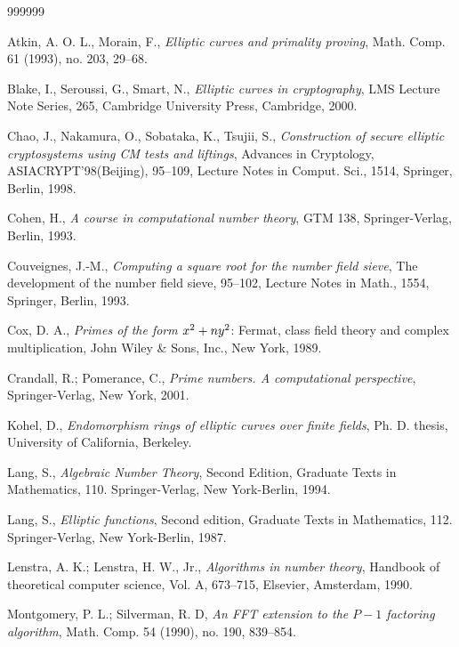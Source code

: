 \documentclass{amsart}
\newcommand{\nn}{\newline \noindent}
\theoremstyle{plain}
\begin{document}
\begin{thebibliography}{999999}

Atkin, A. O. L., Morain, F., 
{\it Elliptic curves and primality proving},
Math. Comp. 61 (1993), no. 203, 29--68. 

Blake, I., Seroussi, G., Smart, N.,
{\it Elliptic curves in cryptography}, LMS Lecture Note Series, 265, 
Cambridge University Press, Cambridge, 2000.

Chao, J., Nakamura, O., Sobataka, K., Tsujii, S., 
{\it Construction of secure elliptic cryptosystems using CM tests and liftings},
Advances in Cryptology, ASIACRYPT'98(Beijing), 95--109, Lecture Notes
in Comput. Sci., 1514, Springer, Berlin, 1998. 

Cohen, H.,
{\it A course in computational number theory}, GTM 138,
Springer-Verlag, Berlin, 1993.

Couveignes, J.-M., 
{\it Computing a square root for the number field sieve}, 
The development of the number field sieve, 95--102, Lecture
Notes in Math., 1554, Springer, Berlin, 1993. 

Cox, D. A., 
{\it Primes of the form $x\sp 2 + ny\sp 2$}: 
Fermat, class field theory and complex multiplication, 
John Wiley \& Sons, Inc., New York, 1989. 

Crandall, R.; Pomerance, C., {\it Prime numbers. A computational perspective},
Springer-Verlag, New York, 2001.


Kohel, D., 
{\it Endomorphism rings of elliptic curves over finite fields},
Ph. D. thesis, University of California, Berkeley. 
\nn{\tt http://www.maths.usyd.edu.au/u/kohel/}

Lang, S., 
{\it Algebraic Number Theory}, Second Edition,
Graduate Texts in Mathematics, 110. Springer-Verlag, New
York-Berlin, 1994. 

Lang, S., 
{\it Elliptic functions}, 
Second edition, Graduate Texts in Mathematics, 112. Springer-Verlag, New
York-Berlin, 1987. 

Lenstra, A. K.; Lenstra, H. W., Jr.,
{\it Algorithms in number theory}, Handbook of theoretical computer science, 
Vol. A, 673--715, Elsevier, Amsterdam, 1990. 

Montgomery, P. L.; Silverman, R. D, 
{\it An FFT extension to the $P-1$ factoring algorithm}, 
Math. Comp. 54 (1990), no. 190, 839--854.


\end{thebibliography}
\end{document}
